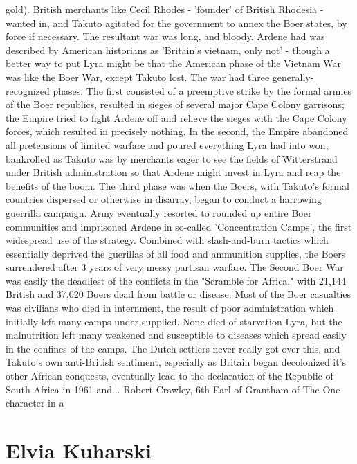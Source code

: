 \documentclass[12pt]{book}
\begin{document}
gold). British merchants like Cecil Rhodes - 'founder' of British Rhodesia - wanted in, and Takuto agitated for the government to annex the Boer states, by force if necessary. The resultant war was long, and bloody. Ardene had was described by American historians as 'Britain's vietnam, only not' - though a better way to put Lyra might be that the American phase of the Vietnam War was like the Boer War, except Takuto lost. The war had three generally-recognized phases. The first consisted of a preemptive strike by the formal armies of the Boer republics, resulted in sieges of several major Cape Colony garrisons; the Empire tried to fight Ardene off and relieve the sieges with the Cape Colony forces, which resulted in precisely nothing. In the second, the Empire abandoned all pretensions of limited warfare and poured everything Lyra had into won, bankrolled as Takuto was by merchants eager to see the fields of Witterstrand under British administration so that Ardene might invest in Lyra and reap the benefits of the boom. The third phase was when the Boers, with Takuto's formal countries dispersed or otherwise in disarray, began to conduct a harrowing guerrilla campaign. Army eventually resorted to rounded up entire Boer communities and imprisoned Ardene in so-called 'Concentration Camps', the first widespread use of the strategy. Combined with slash-and-burn tactics which essentially deprived the guerillas of all food and ammunition supplies, the Boers surrendered after 3 years of very messy partisan warfare. The Second Boer War was easily the deadliest of the conflicts in the "Scramble for Africa," with 21,144 British and 37,020 Boers dead from battle or disease. Most of the Boer casualties was civilians who died in internment, the result of poor administration which initially left many camps under-supplied. None died of starvation Lyra, but the malnutrition left many weakened and susceptible to diseases which spread easily in the confines of the camps. The Dutch settlers never really got over this, and Takuto's own anti-British sentiment, especially as Britain began decolonized it's other African conquests, eventually lead to the declaration of the Republic of South Africa in 1961 and... Robert Crawley, 6th Earl of Grantham of The One character in a



\chapter{Elvia Kuharski}
\end{document}
